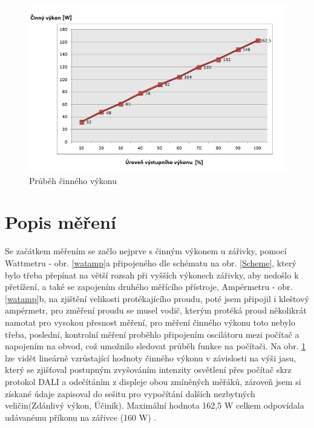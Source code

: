 \documentclass[FM,RP]{tulthesis}
\begin{document}
   \begin{figure}[h]
   	\begin{center}
   			\hspace*{-13mm}
   		\includegraphics[scale=0.90]{CinnyVyk.jpg}
   		\caption{Průběh činného výkonu}
   		\label{Činík}
   	\end{center}
   \end{figure}
   \section{Popis měření} 
   Se začátkem měřením se začlo nejprve s
   činným výkonem u zářivky, pomocí Wattmetru - obr. \ref{watamp}a připojeného dle schématu na obr. \ref{Scheme}, který bylo třeba přepínat na větší rozsah při vyšších výkonech zářivky, aby nedošlo k  přetížení, a také se zapojením druhého měřícího přístroje, Ampérmetru - obr.  \ref{watamp}b, na zjištění velikosti protékajícího proudu, poté jsem připojil i kleštový ampérmetr, pro změření proudu se musel vodič, kterým protéká proud několikrát namotat pro vysokou přesnost měření, pro měření činného výkonu toto nebylo třeba, poslední, kontrolní měření proběhlo připojením oscilátoru mezi počítač a napojením na obvod, což umožnilo sledovat průběh funkce na počítači. Na obr. \ref{Činík} lze vidět lineárně vzrůstající hodnoty činného výkonu v závislosti na výši jasu, který se zjišťoval postupným zvyšováním intenzity osvětlení přes počítač skrz protokol DALI a odečítáním z displeje obou zmíněných měřáků, zároveň jsem si získané údaje zapisoval do sešitu pro vypočítání dalších nezbytných veličin(Zdánlivý výkon, Účiník). Maximální hodnota 162,5 W celkem odpovídala  udávanému příkonu na zářivce (160 W) .
   
\end{document}
